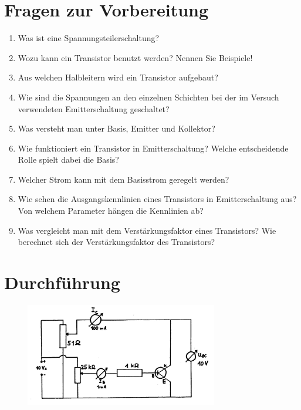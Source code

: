 \section{Fragen zur Vorbereitung}

\begin{enumerate}
	\item Was ist eine Spannungsteilerschaltung?
	\item Wozu kann ein Transistor benutzt werden? Nennen Sie Beispiele!
	\item Aus welchen Halbleitern wird ein Transistor aufgebaut?
	\item Wie sind die Spannungen an den einzelnen Schichten bei der im Versuch verwendeten Emitterschaltung geschaltet?
	\item Was versteht man unter Basis, Emitter und Kollektor?
	\item Wie funktioniert ein Transistor in Emitterschaltung? Welche entscheidende Rolle spielt dabei die Basis?
	\item Welcher Strom kann mit dem Basisstrom geregelt werden?
	\item Wie sehen die Ausgangskennlinien eines Transistors in Emitterschaltung aus? Von welchem Parameter hängen die Kennlinien ab?
	\item Was vergleicht man mit dem Verstärkungsfaktor eines Transistors? Wie berechnet sich der Verstärkungsfaktor des Transistors?
\end{enumerate}

\section{Durchführung} 

\begin{figure}[h]
	\centering
		\includegraphics[width=0.75\textwidth]{Versuch_17-18/Abbildungen/BILD23.JPG}
	\label{fig:BILD23}
\end{figure}

